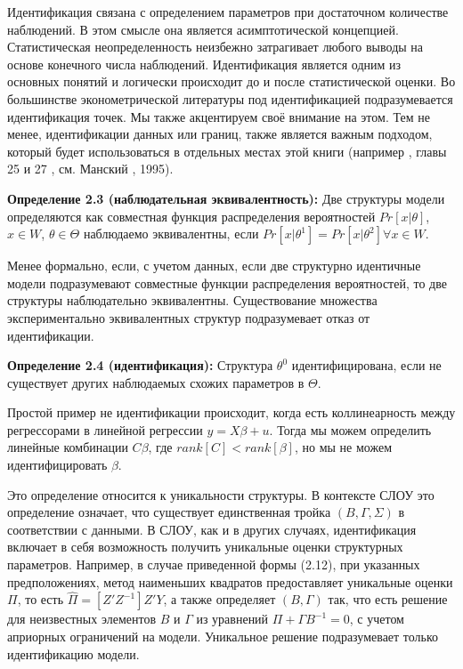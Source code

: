 	Идентификация связана с определением параметров при достаточном количестве наблюдений. В этом смысле она является асимптотической концепцией. Статистическая неопределенность неизбежно затрагивает любого выводы на основе конечного числа наблюдений.  Идентификация является одним из основных понятий и логически происходит до и после статистической оценки. Во большинстве эконометрической литературы под идентификацией подразумевается идентификация точек. Мы также акцентируем своё внимание на этом. Тем не менее, идентификации данных или границ, также является важным подходом, который будет использоваться в отдельных местах этой книги (например , главы 25 и 27 , см. Манский , 1995).


{\bf Определение 2.3 (наблюдательная эквивалентность):} Две структуры модели определяются как совместная функция распределения вероятностей $Pr[x|\theta]$,$x\in W$, $\theta \in \Theta$ наблюдаемо эквивалентны, если $Pr[x|\theta^{1}]=Pr[x|\theta^{2}] \forall x \in W.$ 


Менее формально, если, с учетом данных, если две структурно идентичные модели подразумевают совместные функции   распределения вероятностей, то две структуры наблюдательно эквивалентны. Существование множества экспериментально эквивалентных структур подразумевает отказ от идентификации.

{\bf Определение 2.4 (идентификация):} Структура $\theta^{0}$ идентифицирована, если не существует других наблюдаемых схожих параметров в $\Theta$.


	Простой пример не идентификации происходит, когда есть коллинеарность между регрессорами в линейной регрессии $y=X\beta+u$. Тогда мы можем определить линейные комбинации $C\beta$, где $rank[C] < rank[\beta]$, но мы не можем идентифицировать $\beta$.
	
	
	Это определение относится к уникальности структуры. В контексте СЛОУ это определение означает, что существует единственная тройка $(B,\Gamma,\Sigma)$ в соответствии с данными. В СЛОУ, как и в других случаях, идентификация включает в себя возможность получить уникальные оценки структурных параметров. Например, в случае приведенной формы (2.12), при указанных предположениях, метод наименьших квадратов предоставляет уникальные оценки $\Pi$, то есть $\hat{\Pi}=[Z'Z^{-1}]Z'Y$, а также определяет $(B,\Gamma)$ так, что есть решение для неизвестных элементов $B$ и $\Gamma$ из уравнений $\Pi+\Gamma B^{-1}=0$, с учетом априорных ограничений на модели. Уникальное решение подразумевает только идентификацию модели.


